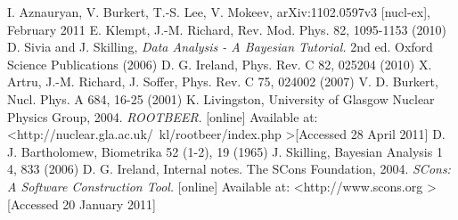 \documentclass[a4paper,12pt]{article}
\begin{document}
\begin{thebibliography}{99}
 I. Aznauryan, V. Burkert, T.-S. Lee, V. Mokeev, arXiv:1102.0597v3 [nucl-ex], February 2011
 E. Klempt, J.-M. Richard, Rev. Mod. Phys. 82, 1095-1153 (2010)
 D. Sivia and J. Skilling, \textit{Data Analysis - A Bayesian Tutorial.} 2nd ed. Oxford Science Publications (2006)
 D. G. Ireland, Phys. Rev. C 82, 025204 (2010)
 X. Artru, J.-M. Richard, J. Soffer, Phys. Rev. C 75, 024002 (2007)
 V. D. Burkert, Nucl. Phys. A 684, 16-25 (2001)
 K. Livingston, University of Glasgow Nuclear Physics Group, 2004. \textit{ROOTBEER}. [online] Available at: \textless http://nuclear.gla.ac.uk/~kl/rootbeer/index.php \textgreater [Accessed 28 April 2011]
 D. J. Bartholomew, Biometrika 52 (1-2), 19 (1965)
 J. Skilling, Bayesian Analysis 1 4, 833 (2006)
 D. G. Ireland, Internal notes.
 The SCons Foundation, 2004. \textit{SCons: A Software Construction Tool.} [online] Available at: \textless http://www.scons.org \textgreater [Accessed 20 January 2011]
\end{thebibliography}
\end{document}
